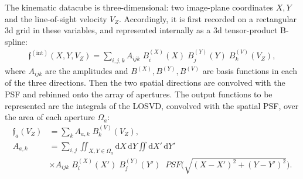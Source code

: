 \documentclass[12pt]{article}
\renewcommand{\d}{\mathrm{d}}
\begin{document}
The kinematic datacube is three-dimensional: two image-plane coordinates $X,Y$ and the line-of-sight velocity $V_Z$. Accordingly, it is first recorded on a rectangular 3d grid in these variables, and represented internally as a 3d tensor-product B-spline: 
\begin{align}  \label{eq:LOSVDinternal}
\mathfrak{f}^\mathrm{(int)}(X,Y,V_Z) = \sum_{i,j,k} A_{ijk}\;B^{(X)}_i(X)\;B^{(Y)}_j(Y)\;B^{(V)}_k(V_Z),
\end{align}
where $A_{ijk}$ are the amplitudes and $B^{(X)},B^{(Y)},B^{(V)}$ are basis functions in each of the three directions. Then the two spatial directions are convolved with the PSF and rebinned onto the array of apertures. The output functions to be represented are the integrals of the LOSVD, convolved with the spatial PSF, over the area of each aperture $\Omega_a$:
\begin{subequations}  \label{eq:LOSVDoutput}
\begin{align}
\mathfrak{f}_a(V_Z) &= \sum_{k} A_{a,k}\;B^{(V)}_k(V_Z), \\
A_{a,k} &= \sum_{i,j} \iint_{X,Y\in \Omega_a} 
\d X\, \d Y  \iint \d X'\, \d Y' \label{eq:LOSVDoutputAmpl} \\
&\times A_{ijk}\;B^{(X)}_i(X')\;B^{(Y)}_j(Y')\;\; PSF\big( \sqrt{ (X-X')^2 + (Y-Y')^2 } \big)  \nonumber.
\end{align}
\end{subequations}
\end{document}
